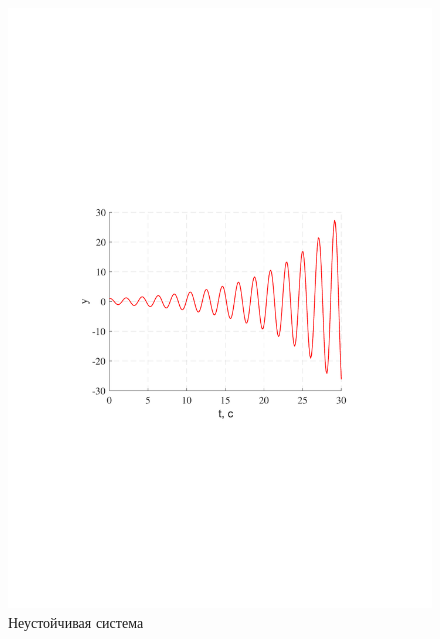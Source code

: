\documentclass[a4paper,12pt]{article}
\begin{document}
		\begin{figure}[h!]
			\centering
			\includegraphics[width=6in]{NeustMOD.pdf}
			\caption{Неустойчивая система}
			\label{s_23}
		\end{figure}			





	\newpage
\end{document}

